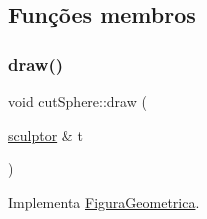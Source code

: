\subsection{Funções membros}
\mbox{\label{classcut_sphere_a647eb845a169437c5c336bdcb282b075}} 
\subsubsection{\texorpdfstring{draw()}{draw()}}
{\footnotesize\ttfamily void cut\+Sphere\+::draw (\begin{DoxyParamCaption}\item[{\mbox{\hyperlink{classsculptor}{sculptor}} \&}]{t }\end{DoxyParamCaption})\hspace{0.3cm}{\ttfamily [virtual]}}



Implementa \mbox{\hyperlink{class_figura_geometrica_ac996dac6561c450beaf5fd643e43e095}{Figura\+Geometrica}}.


